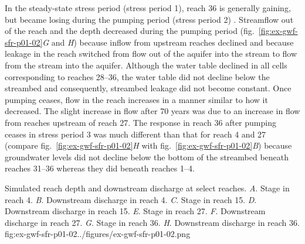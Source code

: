 In the steady-state stress period (stress period 1), reach 36 is generally gaining, but became losing during the pumping period (stress period 2) . Streamflow out of the reach and the depth decreased during the pumping period (fig.~\ref{fig:ex-gwf-sfr-p01-02}\textit{G} and \textit{H}) because inflow from upstream reaches declined and because leakage in the reach switched from flow out of the aquifer into the stream to flow from the stream into the aquifer. Although the water table declined in all cells corresponding to reaches 28--36, the water table did not decline below the streambed and consequently, streambed leakage did not become constant. Once pumping ceases, flow in the reach increases in a manner similar to how it decreased. The slight increase in flow after 70 years was due to an increase in flow from reaches upstream of reach 27. The response in reach 36 after pumping ceases in stress period 3 was much different than that for reach 4 and 27 (compare fig.~\ref{fig:ex-gwf-sfr-p01-02}\textit{H} with fig.~\ref{fig:ex-gwf-sfr-p01-02}\textit{B}) because groundwater levels did not decline below the bottom of the streambed beneath reaches 31--36 whereas they did beneath reaches 1--4. 

\begin{StandardFigure}{
                                     Simulated reach depth and downstream discharge at select reaches. 
                                     \textit{A}. Stage in reach 4.
                                     \textit{B}. Downstream discharge in reach 4.
                                     \textit{C}. Stage in reach 15.
                                     \textit{D}. Downstream discharge in reach 15.
                                     \textit{E}. Stage in reach 27.
                                     \textit{F}. Downstream discharge in reach 27.
                                     \textit{G}. Stage in reach 36.
                                     \textit{H}. Downstream discharge in reach 36.
                                     }{fig:ex-gwf-sfr-p01-02}{../figures/ex-gwf-sfr-p01-02.png}
\end{StandardFigure}                                 

